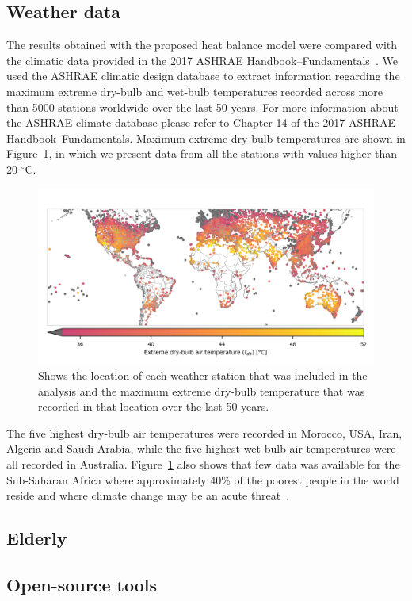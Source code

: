 \subsection{Weather data}\label{subsec:weather-data}

The results obtained with the proposed heat balance model were compared with the climatic data provided in the 2017 ASHRAE Handbook--Fundamentals~\cite{ASHRA2017}.
We used the ASHRAE climatic design database to extract information regarding the maximum extreme dry-bulb and wet-bulb temperatures recorded across more than 5000 stations worldwide over the last 50 years.
For more information about the ASHRAE climate database please refer to Chapter 14 of the 2017 ASHRAE Handbook--Fundamentals.
Maximum extreme dry-bulb temperatures are shown in Figure~\ref{fig:world-map}, in which we present data from all the stations with values higher than 20 $^\circ$C\@.

\begin{figure}[thb!]
    \centering
    \includegraphics[width=\textwidth]{figures/world-map.png}
    \caption{Shows the location of each weather station that was included in the analysis and the maximum extreme dry-bulb temperature that was recorded in that location over the last 50 years.}
    \label{fig:world-map}
\end{figure}

The five highest dry-bulb air temperatures were recorded in Morocco, USA, Iran, Algeria and Saudi Arabia, while the five highest wet-bulb air temperatures were all recorded in Australia.
Figure~\ref{fig:world-map} also shows that few data was available for the Sub-Saharan Africa where approximately 40\% of the poorest people in the world reside and where climate change may be an acute threat~\cite{PovertyO1:online}.

\subsection{Elderly}


\subsection{Open-source tools}

